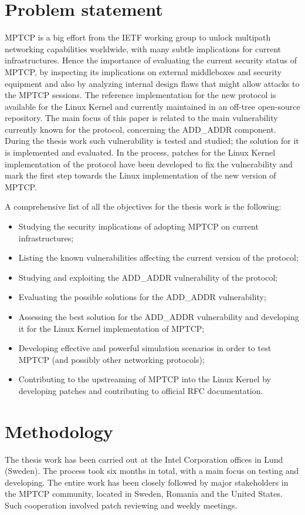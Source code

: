 \section{Problem statement}
MPTCP is a big effort from the IETF working group to unlock multipath networking capabilities worldwide, with many subtle implications for current infrastructures. Hence the importance of evaluating the current security status of MPTCP, by inspecting its implications on external middleboxes and security equipment and also by analyzing internal design flaws that might allow attacks to the MPTCP sessions. 
The reference implementation for the new protocol is available for the Linux Kernel and currently maintained in an off-tree open-source repository.
The main focus of this paper is related to the main vulnerability currently known for the protocol, concerning the ADD\_ADDR component. During the thesis work such vulnerability is tested and studied; the solution for it is implemented and evaluated. In the process, patches for the Linux Kernel implementation of the protocol have been developed to fix the vulnerability and mark the first step towards the Linux implementation of the new version of MPTCP. 

A comprehensive list of all the objectives for the thesis work is the following:
\begin{itemize}
    \item Studying the security implications of adopting MPTCP on current infrastructures; 
    \item Listing the known vulnerabilities affecting the current version of the protocol; 
    \item Studying and exploiting the ADD\_ADDR vulnerability of the protocol;
    \item Evaluating the possible solutions for the ADD\_ADDR vulnerability; 
    \item Assessing the best solution for the ADD\_ADDR vulnerability and developing it for the Linux Kernel implementation of MPTCP;
    \item Developing effective and powerful simulation scenarios in order to test MPTCP (and possibly other networking protocols);
    \item Contributing to the upstreaming of MPTCP into the Linux Kernel by developing patches and contributing to official RFC documentation.
\end{itemize}

\section{Methodology}
The thesis work has been carried out at the Intel Corporation offices in Lund (Sweden). The process took six months in total, with a main focus on testing and developing. The entire work has been closely followed by major stakeholders in the MPTCP community, located in Sweden, Romania and the United States. Such cooperation involved patch reviewing and weekly meetings.

